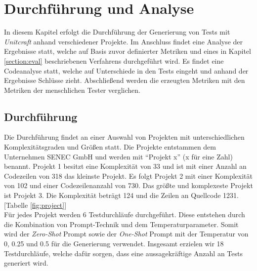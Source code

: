\chapter{Durchführung und Analyse}\label{chap:analysis}
In diesem Kapitel erfolgt die Durchführung der Generierung von Tests mit \textit{Unitcraft} anhand verschiedener Projekte. Im Anschluss findet eine Analyse der Ergebnisse statt, welche auf Basis zuvor definierter Metriken und eines in Kapitel \ref{section:eval} beschriebenen Verfahrens durchgeführt wird. Es findet eine Codeanalyse statt, welche auf Unterschiede in den Tests eingeht und anhand der Ergebnisse Schlüsse zieht. Abschließend werden die erzeugten Metriken mit den Metriken der menschlichen Tester verglichen.

\section{Durchführung}
Die Durchführung findet an einer Auswahl von Projekten mit unterschiedlichen Komplexitätsgraden und Größen statt. Die Projekte entstammen dem Unternehmen SENEC GmbH und werden mit ``Projekt x'' (x für eine Zahl) benannt. Projekt 1 besitzt eine Komplexität von 33 und ist mit einer Anzahl an Codezeilen von 318 das kleinste Projekt. Es folgt Projekt 2 mit einer Komplexität von 102 und einer Codezeilenanzahl von 730. Das größte und komplexeste Projekt ist Projekt 3. Die Komplexität beträgt 124 und die Zeilen an Quellcode 1231. [Tabelle \ref{fig:project}]\\Für jedes Projekt werden 6 Testdurchläufe durchgeführt. Diese entstehen durch die Kombination von Prompt-Technik und dem Temperaturparameter. Somit wird der \textit{Zero-Shot} Prompt sowie der \textit{One-Shot} Prompt mit der Temperatur von 0, 0.25 und 0.5 für die Generierung verwendet. Insgesamt erzielen wir 18 Testdurchläufe, welche dafür sorgen, dass eine aussagekräftige Anzahl an Tests generiert wird.

